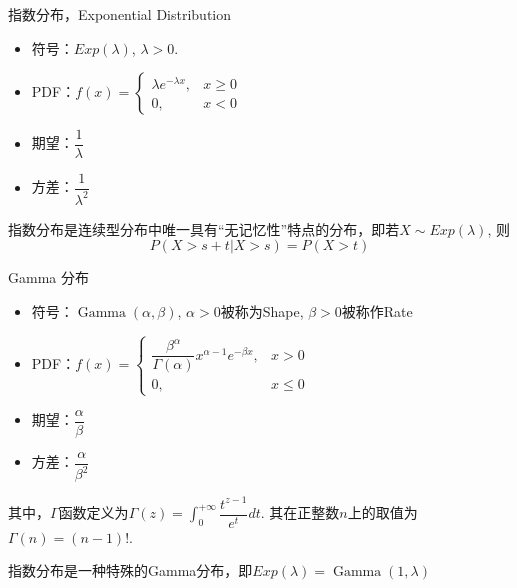 
\begin{frame}

\begin{block}{指数分布，Exponential Distribution}
\begin{itemize}
\item 符号：$Exp(\lambda)$, \; $\lambda > 0$.
\item PDF：$f(x) =
\begin{cases}
\lambda e^{-\lambda x}, & x \ge 0 \\
0, & x < 0
\end{cases}$
\item 期望：$\dfrac{1}{\lambda}$
\item 方差：$\dfrac{1}{\lambda^2}$
\end{itemize}

\vspace{1em}
\pause

指数分布是连续型分布中唯一具有``无记忆性''特点的分布，即若$X\sim Exp(\lambda)$, 则
$$P(X>s+t | X>s) = P(X>t)$$
\end{block}

\end{frame}


\begin{frame}

\begin{block}{Gamma 分布}
\begin{itemize}
\item 符号：$\operatorname{Gamma}(\alpha,\beta)$, $\alpha > 0$被称为Shape, $\beta > 0$被称作Rate
\item PDF：$f(x) = \begin{cases}
\dfrac{\beta^{\alpha}}{\Gamma(\alpha)} x^{\alpha-1} e^{-\beta x}, & x > 0 \\
0, & x \le 0
\end{cases}$
\item 期望：$\dfrac{\alpha}{\beta}$
\item 方差：$\dfrac{\alpha}{\beta^2}$
\end{itemize}
\end{block}

其中，$\Gamma$函数定义为$\displaystyle \Gamma(z) = \int_0^{+\infty} \dfrac{t^{z-1}}{e^t} dt$. 其在正整数$n$上的取值为$\Gamma(n) = (n-1)!$.

\vspace{1em}
\pause

指数分布是一种特殊的Gamma分布，即$Exp(\lambda) = \operatorname{Gamma}(1, \lambda)$

\end{frame}


